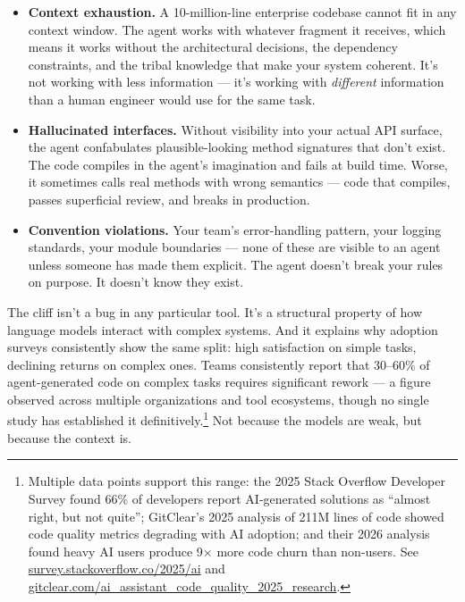 \documentclass[
  a4paper,
  DIV=11,
  numbers=noendperiod]{scrreprt}
\newcounter{none} %
\providecommand{\tightlist}{%
  \setlength{\itemsep}{0pt}\setlength{\parskip}{0pt}}
\begin{document}
\begin{itemize}
\tightlist
\item
  \textbf{Context exhaustion.} A 10-million-line enterprise codebase
  cannot fit in any context window. The agent works with whatever
  fragment it receives, which means it works without the architectural
  decisions, the dependency constraints, and the tribal knowledge that
  make your system coherent. It's not working with less information ---
  it's working with \emph{different} information than a human engineer
  would use for the same task.
\item
  \textbf{Hallucinated interfaces.} Without visibility into your actual
  API surface, the agent confabulates plausible-looking method
  signatures that don't exist. The code compiles in the agent's
  imagination and fails at build time. Worse, it sometimes calls real
  methods with wrong semantics --- code that compiles, passes
  superficial review, and breaks in production.
\item
  \textbf{Convention violations.} Your team's error-handling pattern,
  your logging standards, your module boundaries --- none of these are
  visible to an agent unless someone has made them explicit. The agent
  doesn't break your rules on purpose. It doesn't know they exist.
\end{itemize}

The cliff isn't a bug in any particular tool. It's a structural property
of how language models interact with complex systems. And it explains
why adoption surveys consistently show the same split: high satisfaction
on simple tasks, declining returns on complex ones. Teams consistently
report that 30--60\% of agent-generated code on complex tasks requires
significant rework --- a figure observed across multiple organizations
and tool ecosystems, though no single study has established it
definitively.\footnote{Multiple data points support this range: the 2025
  Stack Overflow Developer Survey found 66\% of developers report
  AI-generated solutions as ``almost right, but not quite''; GitClear's
  2025 analysis of 211M lines of code showed code quality metrics
  degrading with AI adoption; and their 2026 analysis found heavy AI
  users produce 9× more code churn than non-users. See
  \href{https://survey.stackoverflow.co/2025/ai}{survey.stackoverflow.co/2025/ai}
  and
  \href{https://www.gitclear.com/ai_assistant_code_quality_2025_research}{gitclear.com/ai\_assistant\_code\_quality\_2025\_research}.}
Not because the models are weak, but because the context is.
\end{document}
